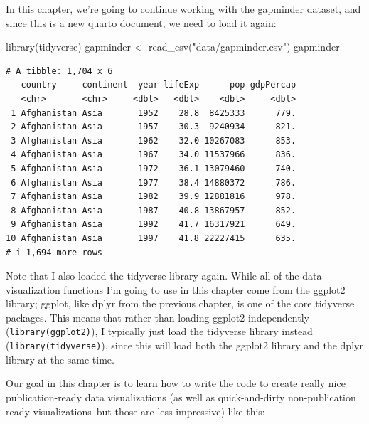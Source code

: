\documentclass[
  letterpaper,
  DIV=11,
  numbers=noendperiod]{scrreprt}
\newenvironment{Shaded}{\begin{snugshade}}{\end{snugshade}}
\newcommand{\FunctionTok}[1]{\textcolor[rgb]{0.28,0.35,0.67}{#1}}
\newcommand{\NormalTok}[1]{\textcolor[rgb]{0.00,0.23,0.31}{#1}}
\newcommand{\OtherTok}[1]{\textcolor[rgb]{0.00,0.23,0.31}{#1}}
\newcommand{\StringTok}[1]{\textcolor[rgb]{0.13,0.47,0.30}{#1}}
\begin{document}
In this chapter, we're going to continue working with the gapminder
dataset, and since this is a new quarto document, we need to load it
again:

\begin{Shaded}
\begin{Highlighting}[]
\FunctionTok{library}\NormalTok{(tidyverse)}
\NormalTok{gapminder }\OtherTok{\textless{}{-}} \FunctionTok{read\_csv}\NormalTok{(}\StringTok{"data/gapminder.csv"}\NormalTok{)}
\NormalTok{gapminder}
\end{Highlighting}
\end{Shaded}

\begin{verbatim}
# A tibble: 1,704 x 6
   country     continent  year lifeExp      pop gdpPercap
   <chr>       <chr>     <dbl>   <dbl>    <dbl>     <dbl>
 1 Afghanistan Asia       1952    28.8  8425333      779.
 2 Afghanistan Asia       1957    30.3  9240934      821.
 3 Afghanistan Asia       1962    32.0 10267083      853.
 4 Afghanistan Asia       1967    34.0 11537966      836.
 5 Afghanistan Asia       1972    36.1 13079460      740.
 6 Afghanistan Asia       1977    38.4 14880372      786.
 7 Afghanistan Asia       1982    39.9 12881816      978.
 8 Afghanistan Asia       1987    40.8 13867957      852.
 9 Afghanistan Asia       1992    41.7 16317921      649.
10 Afghanistan Asia       1997    41.8 22227415      635.
# i 1,694 more rows
\end{verbatim}

Note that I also loaded the tidyverse library again. While all of the
data visualization functions I'm going to use in this chapter come from
the ggplot2 library; ggplot, like dplyr from the previous chapter, is
one of the core tidyverse packages. This means that rather than loading
ggplot2 independently (\texttt{library(ggplot2)}), I typically just load
the tidyverse library instead (\texttt{library(tidyverse)}), since this
will load both the ggplot2 library and the dplyr library at the same
time.

Our goal in this chapter is to learn how to write the code to create
really nice publication-ready data visualizations (as well as
quick-and-dirty non-publication ready visualizations--but those are less
impressive) like this:
\end{document}
